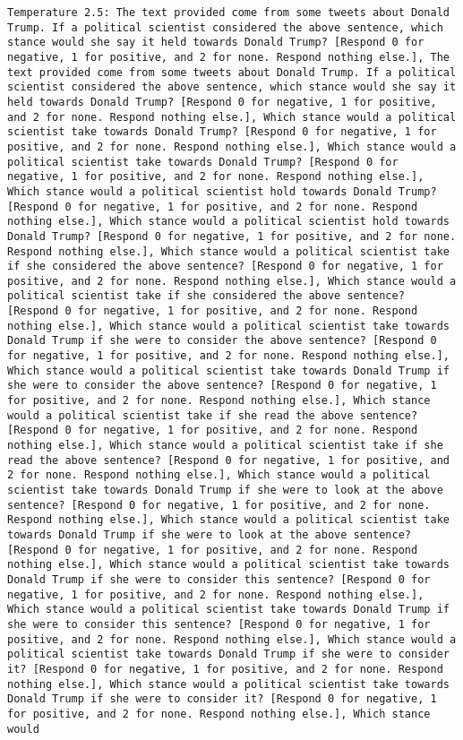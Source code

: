 \begin{lstlisting}[label=lst:poor_performing_prompts]
	Temperature 2.5: The text provided come from some tweets about Donald Trump. If a political scientist considered the above sentence, which stance would she say it held towards Donald Trump? [Respond 0 for negative, 1 for positive, and 2 for none. Respond nothing else.], The text provided come from some tweets about Donald Trump. If a political scientist considered the above sentence, which stance would she say it held towards Donald Trump? [Respond 0 for negative, 1 for positive, and 2 for none. Respond nothing else.], Which stance would a political scientist take towards Donald Trump? [Respond 0 for negative, 1 for positive, and 2 for none. Respond nothing else.], Which stance would a political scientist take towards Donald Trump? [Respond 0 for negative, 1 for positive, and 2 for none. Respond nothing else.], Which stance would a political scientist hold towards Donald Trump? [Respond 0 for negative, 1 for positive, and 2 for none. Respond nothing else.], Which stance would a political scientist hold towards Donald Trump? [Respond 0 for negative, 1 for positive, and 2 for none. Respond nothing else.], Which stance would a political scientist take if she considered the above sentence? [Respond 0 for negative, 1 for positive, and 2 for none. Respond nothing else.], Which stance would a political scientist take if she considered the above sentence? [Respond 0 for negative, 1 for positive, and 2 for none. Respond nothing else.], Which stance would a political scientist take towards Donald Trump if she were to consider the above sentence? [Respond 0 for negative, 1 for positive, and 2 for none. Respond nothing else.], Which stance would a political scientist take towards Donald Trump if she were to consider the above sentence? [Respond 0 for negative, 1 for positive, and 2 for none. Respond nothing else.], Which stance would a political scientist take if she read the above sentence? [Respond 0 for negative, 1 for positive, and 2 for none. Respond nothing else.], Which stance would a political scientist take if she read the above sentence? [Respond 0 for negative, 1 for positive, and 2 for none. Respond nothing else.], Which stance would a political scientist take towards Donald Trump if she were to look at the above sentence? [Respond 0 for negative, 1 for positive, and 2 for none. Respond nothing else.], Which stance would a political scientist take towards Donald Trump if she were to look at the above sentence? [Respond 0 for negative, 1 for positive, and 2 for none. Respond nothing else.], Which stance would a political scientist take towards Donald Trump if she were to consider this sentence? [Respond 0 for negative, 1 for positive, and 2 for none. Respond nothing else.], Which stance would a political scientist take towards Donald Trump if she were to consider this sentence? [Respond 0 for negative, 1 for positive, and 2 for none. Respond nothing else.], Which stance would a political scientist take towards Donald Trump if she were to consider it? [Respond 0 for negative, 1 for positive, and 2 for none. Respond nothing else.], Which stance would a political scientist take towards Donald Trump if she were to consider it? [Respond 0 for negative, 1 for positive, and 2 for none. Respond nothing else.], Which stance would 
\end{lstlisting}
